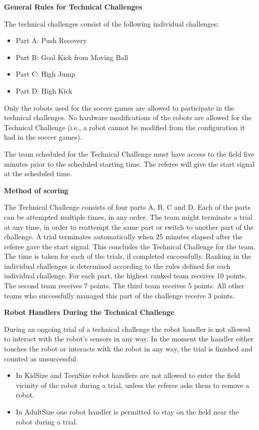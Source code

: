 \clearpage
\sffamily
{\bfseries\color[rgb]{0.4,0.4,0.4}
General Rules for Technical Challenges}

\bigskip

The technical challenges consist of the following individual challenges:

\begin{itemize}
\item Part A: Push Recovery
\item Part B: Goal Kick from Moving Ball
\item Part C: High Jump 
\item Part D: High Kick
\end{itemize}

\bigskip

Only the robots used for the soccer games are allowed to participate in the technical challenges. No hardware modifications of the robots are allowed for the Technical Challenge (i.e., a robot cannot be modified from the configuration it had in the soccer games).

\bigskip

The team scheduled for the Technical Challenge must have access to the field five minutes prior to the scheduled starting time. The referee will give the start signal at the scheduled time.

\bigskip

{\bfseries Method of scoring}

\headlinebox
 
The Technical Challenge consists of four parts A, B, C and D. Each of the parts can be attempted multiple times, in any order. The team might terminate a trial at any time, in order to reattempt the same part or switch to another part of the challenge. A trial terminates automatically when 25 minutes elapsed after the referee gave the start
signal. This concludes the Technical Challenge for the team. The time is taken for each of the trials, if completed successfully. Ranking in the individual challenges is determined according to the rules defined
for each individual challenge. For each part, the highest ranked team receives 10 points. The second team receives 7 points. The third team receives 5 points. All other teams who successfully managed this part of the challenge receive 3 points.

\bigskip

{\bfseries Robot Handlers During the Technical Challenge}

\headlinebox

During an ongoing trial of a technical challenge the robot handler is not allowed to interact with the robot's sensors in any way. In the moment the handler either touches the robot or interacts with the robot in any way, the trial is finished and counted as unsuccessful.

\begin{itemize}
\item In KidSize and TeenSize robot handlers are not allowed to enter the field vicinity of the robot during a trial, unless the referee asks them to remove a robot.
\item In AdultSize one robot handler is permitted to stay on the field near the robot during a trial.
\end{itemize}